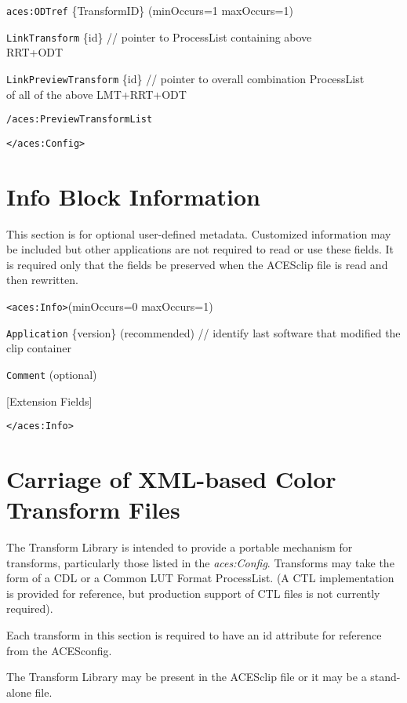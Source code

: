 	\tabto{4em}\texttt{aces:ODTref} \{TransformID\} \tabto{3in}(minOccurs=1 maxOccurs=1)\par
	\tabto{6em}\texttt{LinkTransform} \{id\} \tabto{3.5in}// pointer to ProcessList containing above \\\tabto{3.6in}RRT+ODT\par
	\tabto{4em}\texttt{LinkPreviewTransform} \{id\} \tabto{3.5in}// pointer to overall combination ProcessList \\\tabto{3.6in}of all of the above LMT+RRT+ODT\par
	\tabto{2em}\texttt{/aces:PreviewTransformList} \par

\texttt{</aces:Config>}

\section{Info Block Information}
This section is for optional user-defined metadata.  Customized information may be included but other applications are not required to read or use these fields. It is required only that the fields be preserved when the ACESclip file is read and then rewritten. 

\texttt{<aces:Info>}\tabto{1.5in}(minOccurs=0 maxOccurs=1)

	\tabto{4em}\texttt{Application} \{version\} \tabto{2.25in}(recommended) \tabto{3.25in}// identify last software that modified the \\\tabto{3.35in}clip container\par
	\tabto{4em}\texttt{Comment} \tabto{2.25in}(optional) \par
	\tabto{4em}[Extension Fields]
	
\texttt{</aces:Info>}

\section{Carriage of XML-based Color Transform Files}
The Transform Library is intended to provide a portable mechanism for transforms, particularly those listed in the \textit{aces:Config}.  Transforms may take the form of a CDL or a Common LUT Format ProcessList. (A CTL implementation is provided for reference, but production support of CTL files is not currently required).

Each transform in this section is required to have an {id} attribute for reference from the ACESconfig.

The Transform Library may be present in the ACESclip file or it may be a stand-alone file.

